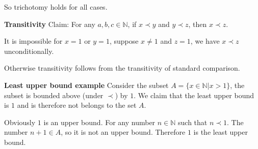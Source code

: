 \begin{flushleft}
So trichotomy holds for all cases.

\textbf{Transitivity} Claim: For any $ a, b, c \in \mathbb{N} $, if $ x \prec y $ and $ y \prec z $, then $ x \prec z $.

It is impossible for $ x = 1 $ or $ y = 1 $, suppose $ x \ne 1 $ and $ z = 1 $, we have $ x \prec z $ unconditionally.

Otherwise transitivity follows from the transitivity of standard comparison.

\textbf{Least upper bound example}
Consider the subset $ A = \{x \in \mathbb{N} | x > 1\} $, the subset is bounded above (under $ \prec $) by $ 1 $. We claim that the least upper bound is $ 1 $ and is therefore not belongs to the set $ A $.

Obviously $ 1 $ is an upper bound. For any number $ n \in \mathbb{N} $ such that $ n \prec 1 $. The number $ n + 1 \in A $, so it is not an upper bound. Therefore $ 1 $ is the least upper bound.

\end{flushleft}